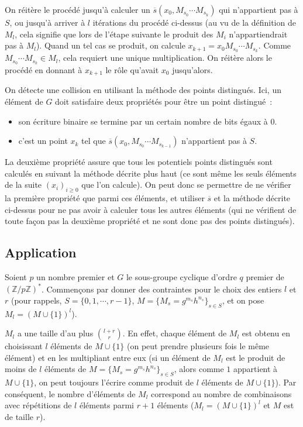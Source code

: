       On réitère le procédé jusqu'à calculer un $\overline{s}(x_0,M_{s_0} \cdots M_{s_k})$ qui n'appartient pas à $S$, ou jusqu'à arriver à $l$ itérations du procédé ci-dessus (au vu de la définition de $M_l$, cela signifie que lors de l'étape suivante le produit des $M_i$ n'appartiendrait pas à $M_l$). Quand un tel cas se produit, on calcule $x_{k+1} = x_0 M_{s_0} \cdots M_{s_k}$. Comme $M_{s_0} \cdots M_{s_k} \in M_l$, cela requiert une unique multiplication. On réitère alors le procédé en donnant à $x_{k+1}$ le rôle qu'avait $x_0$ jusqu'alors.

      On détecte une collision en utilisant la méthode des points distingués. Ici, un élément de $G$ doit satisfaire deux propriétés pour être un point distingué~:

      \begin{itemize}
        \item son écriture binaire se termine par un certain nombre de bits égaux à $0$.
        \item c'est un point $x_k$ tel que $\overline{s}(x_0,M_{s_0} \cdots M_{s_{k-1}})$ n'appartient pas à $S$.
      \end{itemize}

      La deuxième propriété assure que tous les potentiels points distingués sont calculés en suivant la méthode décrite plus haut (ce sont même les seuls éléments de la suite $(x_i)_{i \ge 0}$ que l'on calcule). On peut donc se permettre de ne vérifier la première propriété que parmi ces éléments, et utiliser $\overline{s}$ et la méthode décrite ci-dessus pour ne pas avoir à calculer tous les autres éléments (qui ne vérifient de toute façon pas la deuxième propriété et ne sont donc pas des points distingués).


    \subsection{Application}
    Soient $p$ un nombre premier et $G$ le sous-groupe cyclique d'ordre $q$ premier de $(\mathbb{Z}/p\mathbb{Z})^*$. Commençons par donner des contraintes pour le choix des entiers $l$ et $r$ (pour rappels, $S = \{0,1,\cdots,r-1\}$, $M=\{M_s = g^{m_s} h^{n_s}\}_{s \in S}$, et on pose $M_l = (M\cup\{1\})^l$).

    $M_l$ a une taille d'au plus $\binom{l+r}{r}$. En effet, chaque élément de $M_l$ est obtenu en choisissant $l$ éléments de $M\cup\{1\}$ (on peut prendre plusieurs fois le même élément) et en les multipliant entre eux (si un élément de $M_l$ est le produit de moins de $l$ éléments de $M = \{M_s = g^{m_s} h^{n_s}\}_{s \in S}$, alors comme $1$ appartient à $M\cup\{1\}$, on peut toujours l'écrire comme produit de $l$ éléments de $M\cup\{1\}$). Par conséquent, le nombre d'éléments de $M_l$ correspond au nombre de combinaisons avec répétitions de $l$ éléments parmi $r + 1$ éléments ($M_l = (M\cup\{1\})^l$ et $M$ est de taille $r$).

